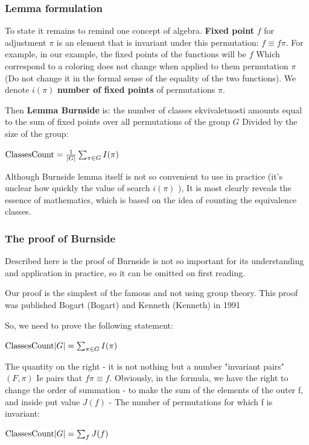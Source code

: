 \subsubsection{ Lemma formulation }

To state it remains to remind one concept of algebra. \textbf{Fixed point} $f$ for adjustment $\pi$ is an element that is invariant under this permutation: $f \equiv f \pi$. For example, in our example, the fixed points of the functions will be $f$ Which correspond to a coloring does not change when applied to them permutation $\pi$ (Do not change it in the formal sense of the equality of the two functions). We denote $i (\pi)$ \textbf{number of fixed points} of permutations $\pi$.

Then \textbf{Lemma Burnside} is: the number of classes ekvivaletnosti amounts equal to the sum of fixed points over all permutations of the group $G$ Divided by the size of the group:

${\rm ClassesCount}=\frac{1}{|G|}\sum_{\pi\in G}I(\pi)$

Although Burnside lemma itself is not so convenient to use in practice (it's unclear how quickly the value of search $i (\pi)$ ), It is most clearly reveals the essence of mathematics, which is based on the idea of ​​counting the equivalence classes.

\subsubsection{ The proof of Burnside }

Described here is the proof of Burnside is not so important for its understanding and application in practice, so it can be omitted on first reading.

Our proof is the simplest of the famous and not using group theory. This proof was published Bogart (Bogart) and Kenneth (Kenneth) in 1991

So, we need to prove the following statement:

${\rm ClassesCount} | G | = \sum_ {\pi \in G} I (\pi)$

The quantity on the right - it is not nothing but a number "invariant pairs" $(F, \pi)$ Ie pairs that $f \pi \equiv f$. Obviously, in the formula, we have the right to change the order of summation - to make the sum of the elements of the outer f, and inside put value $J (f)$ - The number of permutations for which f is invariant:

${\rm ClassesCount} | G | = \sum_ {f} J (f)$

